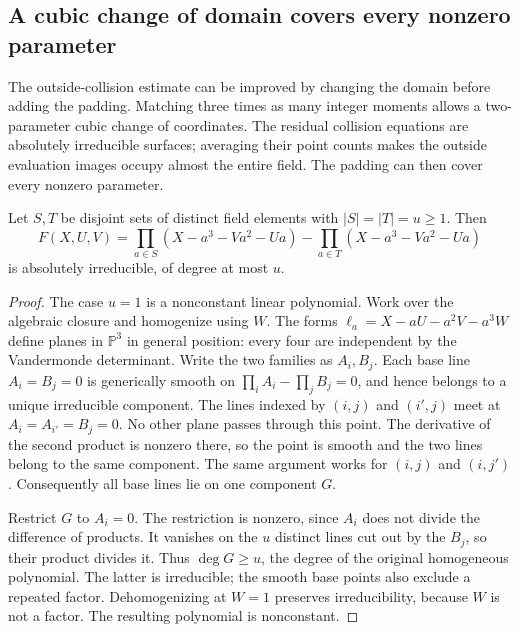 \subsection{A cubic change of domain covers every nonzero parameter}
\label{sec:cubic-warp}

The outside-collision estimate can be improved by changing the domain
before adding the padding. Matching three times as many integer moments
allows a two-parameter cubic change of coordinates. The residual
collision equations are absolutely irreducible surfaces; averaging their
point counts makes the outside evaluation images occupy almost the
entire field. The padding can then cover every nonzero parameter.

\begin{lemma}
\label{cw:irreducibility}
Let $S,T$ be disjoint sets of distinct field elements with
$|S|=|T|=u\ge1$. Then
\[
 F(X,U,V)=\prod_{a\in S}(X-a^3-Va^2-Ua)
          -\prod_{a\in T}(X-a^3-Va^2-Ua)
\]
is absolutely irreducible, of degree at most $u$.
\end{lemma}
\begin{proof}
The case $u=1$ is a nonconstant linear polynomial. Work over the
algebraic closure and homogenize using $W$. The forms
$\ell_a=X-aU-a^2V-a^3W$ define planes in $\mathbb P^3$ in general
position: every four are independent by the Vandermonde determinant.
Write the two families as $A_i,B_j$. Each base line $A_i=B_j=0$
is generically smooth on $\prod_iA_i-\prod_jB_j=0$, and hence belongs
to a unique irreducible component. The lines indexed by $(i,j)$ and
$(i',j)$ meet at $A_i=A_{i'}=B_j=0$. No other plane passes through
this point. The derivative of the second product is nonzero there,
so the point is smooth and the two lines belong to the same component.
The same argument works for $(i,j)$ and $(i,j')$. Consequently all
base lines lie on one component $G$.

Restrict $G$ to $A_i=0$. The restriction is nonzero, since $A_i$
does not divide the difference of products. It vanishes on the $u$
distinct lines cut out by the $B_j$, so their product divides it.
Thus $\deg G\ge u$, the degree of the original homogeneous polynomial.
The latter is irreducible; the smooth base points also exclude a repeated
factor. Dehomogenizing at $W=1$ preserves irreducibility, because $W$
is not a factor. The resulting polynomial is nonconstant.
\end{proof}

